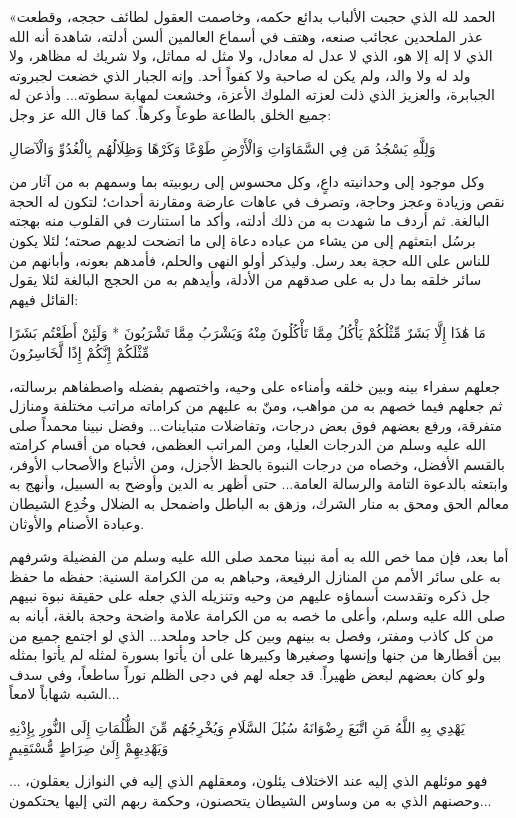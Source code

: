 «الحمد لله الذي حجبت الألباب بدائع حكمه، وخاصمت العقول لطائف حججه، وقطعت عذر الملحدين عجائب صنعه، وهتف في أسماع العالمين ألسن أدلته، شاهدة أنه الله الذي لا إله إلا هو، الذي لا عدل له معادل، ولا مثل له مماثل، ولا شريك له مظاهر، ولا ولد له ولا والد، ولم يكن له صاحبة ولا كفواً أحد. وإنه الجبار الذي خضعت لجبروته الجبابرة، والعزيز الذي ذلت لعزته الملوك الأعزة، وخشعت لمهابة سطوته... وأذعن له جميع الخلق بالطاعة طوعاً وكرهاً. كما قال الله عز وجل:
\begin{ayah}
وَلِلَّهِ يَسْجُدُ مَن فِي السَّمَاوَاتِ وَالْأَرْضِ طَوْعًا وَكَرْهًا وَظِلَالُهُم بِالْغُدُوِّ وَالْآصَالِ
\end{ayah}
وكل موجود إلى وحدانيته داعٍ، وكل محسوس إلى ربوبيته بما وسمهم به من آثار من نقص وزيادة وعجز وحاجة، وتصرف في عاهات عارضة ومقارنة أحداث؛ لتكون له الحجة البالغة. 
ثم أردف ما شهدت به من ذلك أدلته، وأكد ما استنارت في القلوب منه بهجته برسُل ابتعثهم إلى من يشاء من عباده دعاة إلى ما اتضحت لديهم صحته؛ لئلا يكون للناس على الله حجة بعد رسل. وليذكر أولو النهى والحلم، فأمدهم بعونه، وأبانهم من سائر خلقه بما دل به على صدقهم من الأدلة، وأيدهم به من الحجج البالغة لئلا يقول القائل فيهم:
\begin{ayah}
مَا هَٰذَا إِلَّا بَشَرٌ مِّثْلُكُمْ يَأْكُلُ مِمَّا تَأْكُلُونَ مِنْهُ وَيَشْرَبُ مِمَّا تَشْرَبُونَ * وَلَئِنْ أَطَعْتُم بَشَرًا مِّثْلَكُمْ إِنَّكُمْ إِذًا لَّخَاسِرُونَ
\end{ayah}
جعلهم سفراء بينه وبين خلقه وأمناءه على وحيه، واختصهم بفضله واصطفاهم برسالته، ثم جعلهم فيما خصهم به من مواهب، ومنّ به عليهم من كراماته مراتب مختلفة ومنازل متفرقة، ورفع بعضهم فوق بعض درجات، وتفاضلات متباينات... وفضل نبينا محمداً صلى الله عليه وسلم من الدرجات العليا، ومن المراتب العظمى، فحباه من أقسام كرامته بالقسم الأفضل، وخصاه من درجات النبوة بالحظ الأجزل، ومن الأتباع والأصحاب الأوفر، وابتعثه بالدعوة التامة والرسالة العامة... حتى أظهر به الدين وأوضح به السبيل، وأنهج به معالم الحق ومحق به منار الشرك، وزهق به الباطل واضمحل به الضلال وخُدِع الشيطان وعبادة الأصنام والأوثان.

أما بعد، فإن مما خص الله به أمة نبينا محمد صلى الله عليه وسلم من الفضيلة وشرفهم به على سائر الأمم من المنازل الرفيعة، وحباهم به من الكرامة السنية: حفظه ما حفظ جل ذكره وتقدست أسماؤه عليهم من وحيه وتنزيله الذي جعله على حقيقة نبوة نبيهم صلى الله عليه وسلم، وأعلى ما خصه به من الكرامة علامة واضحة وحجة بالغة، أبانه به من كل كاذب ومفتر، وفصل به بينهم وبين كل جاحد وملحد... الذي لو اجتمع جميع من بين أقطارها من جنها وإنسها وصغيرها وكبيرها على أن يأتوا بسورة لمثله لم يأتوا بمثله ولو كان بعضهم لبعض ظهيراً. قد جعله لهم في دجى الظلم نوراً ساطعاً، وفي سدف الشبه شهاباً لامعاً...
\begin{ayah}
يَهْدِي بِهِ اللَّهُ مَنِ اتَّبَعَ رِضْوَانَهُ سُبُلَ السَّلَامِ وَيُخْرِجُهُم مِّنَ الظُّلُمَاتِ إِلَى النُّورِ بِإِذْنِهِ وَيَهْدِيهِمْ إِلَىٰ صِرَاطٍ مُّسْتَقِيمٍ
\end{ayah}
... فهو موئلهم الذي إليه عند الاختلاف يئلون، ومعقلهم الذي إليه في النوازل يعقلون، وحصنهم الذي به من وساوس الشيطان يتحصنون، وحكمة ربهم التي إليها يحتكمون... 


